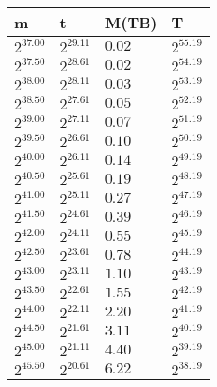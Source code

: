 \begin{tabular}{llll}
m & t & M(TB) & T \\ \hline
$2^{37.00}$ & $2^{29.11}$ & $0.02$ & $2^{55.19}$ \\
$2^{37.50}$ & $2^{28.61}$ & $0.02$ & $2^{54.19}$ \\
$2^{38.00}$ & $2^{28.11}$ & $0.03$ & $2^{53.19}$ \\
$2^{38.50}$ & $2^{27.61}$ & $0.05$ & $2^{52.19}$ \\
$2^{39.00}$ & $2^{27.11}$ & $0.07$ & $2^{51.19}$ \\
$2^{39.50}$ & $2^{26.61}$ & $0.10$ & $2^{50.19}$ \\
$2^{40.00}$ & $2^{26.11}$ & $0.14$ & $2^{49.19}$ \\
$2^{40.50}$ & $2^{25.61}$ & $0.19$ & $2^{48.19}$ \\
$2^{41.00}$ & $2^{25.11}$ & $0.27$ & $2^{47.19}$ \\
$2^{41.50}$ & $2^{24.61}$ & $0.39$ & $2^{46.19}$ \\
$2^{42.00}$ & $2^{24.11}$ & $0.55$ & $2^{45.19}$ \\
$2^{42.50}$ & $2^{23.61}$ & $0.78$ & $2^{44.19}$ \\
$2^{43.00}$ & $2^{23.11}$ & $1.10$ & $2^{43.19}$ \\
$2^{43.50}$ & $2^{22.61}$ & $1.55$ & $2^{42.19}$ \\
$2^{44.00}$ & $2^{22.11}$ & $2.20$ & $2^{41.19}$ \\
$2^{44.50}$ & $2^{21.61}$ & $3.11$ & $2^{40.19}$ \\
$2^{45.00}$ & $2^{21.11}$ & $4.40$ & $2^{39.19}$ \\
$2^{45.50}$ & $2^{20.61}$ & $6.22$ & $2^{38.19}$ \\
\end{tabular}
\\\\
\\\\
